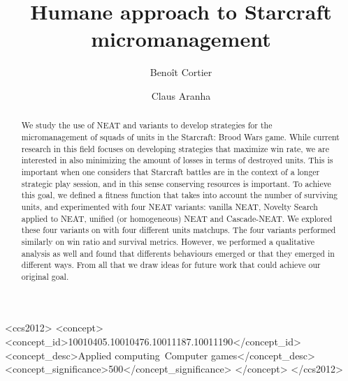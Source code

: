 \documentclass[sigconf, authordraft, anonymous]{acmart}
\begin{document}
\title{Humane approach to Starcraft micromanagement}

\author{Benoît Cortier}

\author{Claus Aranha}

\begin{abstract}
We study the use of NEAT and variants to develop strategies for the
micromanagement of squads of units in the Starcraft: Brood Wars game.
While current research in this field focuses on developing strategies
that maximize win rate, we are interested in also minimizing the amount
of losses in terms of destroyed units. This is important when one considers
that Starcraft battles are in the context of a longer strategic play session,
and in this sense conserving resources is important. To achieve this goal,
we defined a fitness function that takes into account the number of
surviving units, and experimented with four NEAT variants: vanilla NEAT,
Novelty Search applied to NEAT, unified (or homogeneous) NEAT and Cascade-NEAT. We
explored these four variants on with four different units matchups. The
four variants performed similarly on win ratio and survival metrics.
However, we performed a qualitative analysis as well and found that differents
behaviours emerged or that they emerged in different ways. From all that we draw
ideas for future work that could achieve our original goal.
\end{abstract}

\begin{CCSXML}
<ccs2012>
<concept>
<concept_id>10010405.10010476.10011187.10011190</concept_id>
<concept_desc>Applied computing~Computer games</concept_desc>
<concept_significance>500</concept_significance>
</concept>
</ccs2012>
\end{CCSXML}

\end{document}
